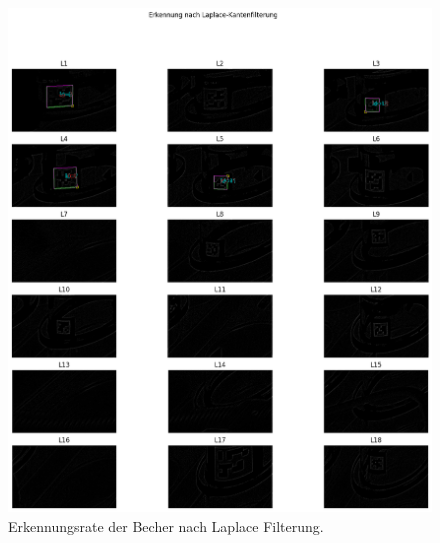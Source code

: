     \begin{figure}
        \caption[Erkennungsrate der BEcher mit Laplace Filter]{\small Erkennungsrate der Becher nach Laplace Filterung.}\label{fig:figure24}
        \includegraphics[width = \textwidth]{Bilder/ErkennungsrateLaplace.png}
        \centering
    \end{figure}

